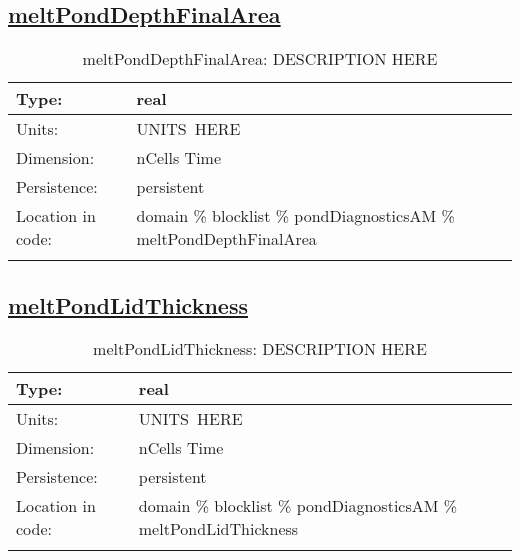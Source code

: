 \subsection[meltPondDepthFinalArea]{\hyperref[sec:var_tab_pondDiagnosticsAM]{meltPondDepthFinalArea}}
\label{subsec:var_sec_pondDiagnosticsAM_meltPondDepthFinalArea}
\begin{center}
\begin{longtable}{| p{2.0in} | p{4.0in} |}
        \hline 
        Type: & real \\
        \hline 
        Units: & \si{UNITS.HERE} \\
        \hline 
        Dimension: & nCells Time \\
        \hline 
        Persistence: & persistent \\
        \hline 
         Location in code: & domain \% blocklist \% pondDiagnosticsAM \% meltPondDepthFinalArea \\
         \hline 
    \caption{meltPondDepthFinalArea: DESCRIPTION HERE}
\end{longtable}
\end{center}
\subsection[meltPondLidThickness]{\hyperref[sec:var_tab_pondDiagnosticsAM]{meltPondLidThickness}}
\label{subsec:var_sec_pondDiagnosticsAM_meltPondLidThickness}
\begin{center}
\begin{longtable}{| p{2.0in} | p{4.0in} |}
        \hline 
        Type: & real \\
        \hline 
        Units: & \si{UNITS.HERE} \\
        \hline 
        Dimension: & nCells Time \\
        \hline 
        Persistence: & persistent \\
        \hline 
         Location in code: & domain \% blocklist \% pondDiagnosticsAM \% meltPondLidThickness \\
         \hline 
    \caption{meltPondLidThickness: DESCRIPTION HERE}
\end{longtable}
\end{center}

